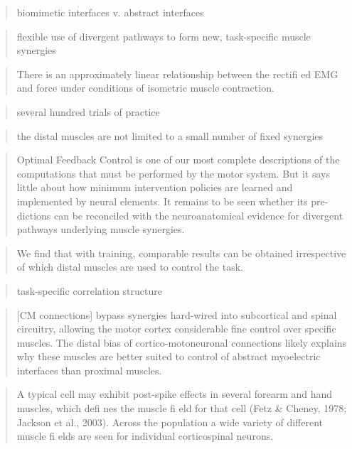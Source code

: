 \documentclass[../main.tex]{subfiles}
\begin{document}
{{{{{{{{{{{\begin{quote}
biomimetic interfaces v. abstract interfaces
\end{quote}

\begin{quote}
flexible use of divergent pathways to form new, task-specific muscle
synergies
\end{quote}

\begin{quote}
There is an approximately linear relationship between the rectifi ed EMG
and force under conditions of isometric muscle contraction.
\end{quote}

\begin{quote}
several hundred trials of practice
\end{quote}

\begin{quote}
the distal muscles are not limited to a small number of fixed synergies
\end{quote}

\begin{quote}
Optimal Feedback Control is one of our most complete descriptions of the
computations that must be performed by the motor system. But it says
little about how minimum intervention policies are learned and
implemented by neural elements. It remains to be seen whether its
pre-dictions can be reconciled with the neuroanatomical evidence for
divergent pathways underlying muscle synergies.
\end{quote}

\begin{quote}
We find that with training, comparable results can be obtained
irrespective of which distal muscles are used to control the task.
\end{quote}

\begin{quote}
task-specific correlation structure
\end{quote}

\begin{quote}
{[}CM connections{]} bypass synergies hard-wired into subcortical and
spinal circuitry, allowing the motor cortex considerable fine control
over specific muscles. The distal bias of cortico-motoneuronal
connections likely explains why these muscles are better suited to
control of abstract myoelectric interfaces than proximal muscles.
\end{quote}

\begin{quote}
A typical cell may exhibit post-spike effects in several forearm and
hand muscles, which defi nes the muscle fi eld for that cell (Fetz \&
Cheney, 1978; Jackson et al., 2003). Across the population a wide
variety of different muscle fi elds are seen for individual
corticospinal neurons.
\end{quote}

}}}}}}}}}}}
\end{document}

